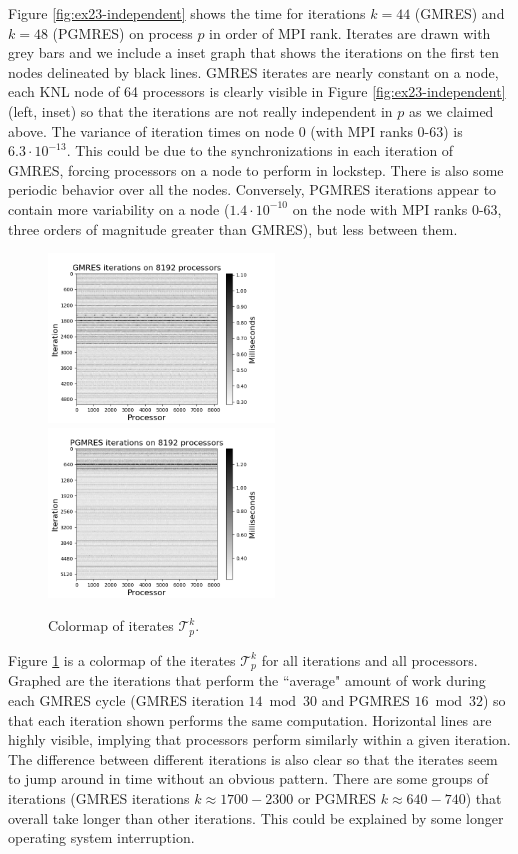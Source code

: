 \documentclass[sigconf, anonymous]{acmart}
\begin{document}
Figure \ref{fig:ex23-independent} shows the time for iterations $k=44$ (GMRES) and $k=48$ (PGMRES) on process $p$ in order of MPI rank. Iterates are drawn with grey bars and we include a inset graph that shows the iterations on the first ten nodes delineated by black lines. 
GMRES iterates are nearly constant on a node, each KNL node of 64 processors is clearly visible in Figure \ref{fig:ex23-independent} (left, inset) so that the iterations are not really independent in $p$ as we claimed above. The variance of iteration times on node 0 (with MPI ranks 0-63) is $6.3\cdot10^{-13}$. 
This could be due to the synchronizations in each iteration of GMRES, forcing processors on a node to perform in lockstep. 
There is also some periodic behavior over all the nodes.
Conversely, PGMRES iterations appear to contain more variability on a node ($1.4\cdot10^{-10}$ on the node with MPI ranks 0-63, three orders of magnitude greater than GMRES), but less between them. 

\begin{figure}[b]
\centering
\includegraphics[width=6cm]{../plots/GMRES_ex23_8192_1000000__stationary_in_t_colormap.png}
\includegraphics[width=6cm]{../plots/PGMRES_ex23_8192_1000000__stationary_in_t_colormap.png}
\caption{Colormap of iterates $\mathcal{T}_p^k$.} \label{fig:ex23-stationary}
\end{figure}




Figure \ref{fig:ex23-stationary} is a colormap of the iterates $\mathcal{T}_p^k$ for all iterations and all processors.
Graphed are the iterations that perform the ``average" amount of work during each GMRES cycle (GMRES iteration $14 \bmod 30$ and PGMRES $16 \bmod 32$) so that each iteration shown performs the same computation. 
Horizontal lines are highly visible, implying that processors perform similarly within a given iteration. 
The difference between different iterations is also clear so that the iterates seem to jump around in time without an obvious pattern.
There are some groups of iterations (GMRES iterations $k \approx 1700 - 2300$ or PGMRES $k \approx 640 - 740$) that overall take longer than other iterations. This could be explained by some longer operating system interruption.
\end{document}
